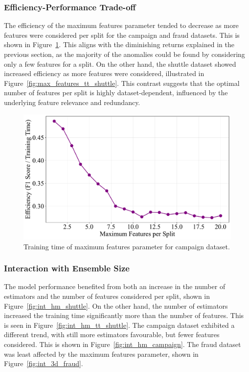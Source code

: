 \documentclass[10pt, conference]{IEEEtran}
\begin{document}
\subsubsection{Efficiency-Performance Trade-off}

The efficiency of the maximum features parameter tended to decrease as more features were considered per split for the campaign and fraud datasets. This is shown in Figure~\ref{fig:max_features_tt_campaign}. This aligns with the diminishing returns explained in the previous section, as the majority of the anomalies could be found by considering only a few features for a split. On the other hand, the shuttle dataset showed increased efficiency as more features were considered, illustrated in Figure~\ref{fig:max_features_tt_shuttle}. This contrast suggests that the optimal number of features per split is highly dataset-dependent, influenced by the underlying feature relevance and redundancy.




\begin{figure}[H]
	\centering
	\includegraphics[width=0.95\linewidth]{../results/campaign/max_features/efficiency_vs_max_features.pdf}
	\caption{Training time of maximum features parameter for campaign dataset.}
	\label{fig:max_features_tt_campaign}
\end{figure}

\subsubsection{Interaction with Ensemble Size}
The model performance benefited from both an increase in the number of estimators and the number of features considered per split, shown in Figure~\ref{fig:int_hm_shuttle}.  On the other hand, the number of estimators increased the training time significantly more than the number of features. This is seen in Figure~\ref{fig:int_hm_tt_shuttle}. The campaign dataset exhibited a different trend, with still more estimators favourable, but fewer features considered. This is shown in Figure~\ref{fig:int_hm_campaign}. The fraud dataset was least affected by the maximum features parameter, shown in Figure~\ref{fig:int_3d_fraud}.
\end{document}
